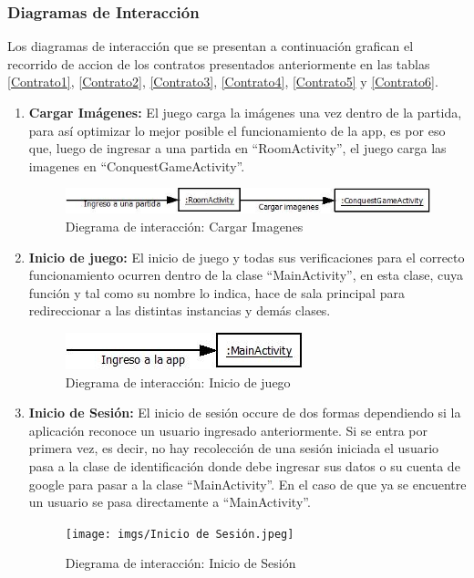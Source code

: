 \documentclass[12pt]{article}
\begin{document}
\subsubsection{Diagramas de Interacción}
Los diagramas de interacción que se presentan a continuación grafican el recorrido de accion de los contratos presentados anteriormente en las tablas \ref{Contrato1}, \ref{Contrato2}, \ref{Contrato3}, \ref{Contrato4}, \ref{Contrato5} y \ref{Contrato6}.
\bigskip
\begin{enumerate}[1.]
	\item \textbf{Cargar Imágenes:}
El juego carga la imágenes una vez dentro de la partida, para así optimizar lo mejor posible el funcionamiento de la app, es por eso que, luego de ingresar a una partida en “RoomActivity”, el juego carga las imagenes en “ConquestGameActivity”.
	\begin{figure}[H]
		\centering
		\includegraphics[scale=1]{imgs/Cargar Imagenes.jpeg}
		\caption{Diegrama de interacción: Cargar Imagenes}
	\end{figure}

	\item \textbf{Inicio de juego:}
El inicio de juego y todas sus verificaciones para el correcto funcionamiento ocurren dentro de la clase “MainActivity”, en esta clase, cuya función y tal como su nombre lo indica, hace de sala principal para redireccionar a las distintas instancias y demás clases.

	\begin{figure}[H]
		\centering
		\includegraphics[scale=1]{imgs/Inicio de juego.jpeg}
		\caption{Diegrama de interacción: Inicio de juego}
	\end{figure}

	\item \textbf{Inicio de Sesión:}
El inicio de sesión occure de dos formas dependiendo si la aplicación reconoce un usuario ingresado anteriormente. Si se entra por primera vez, es decir, no hay recolección de una sesión iniciada el usuario pasa a la clase de identificación donde debe ingresar sus datos o su cuenta de google para pasar a la clase “MainActivity”. En el caso de que ya se encuentre un usuario se pasa directamente a “MainActivity”.
	\begin{figure}[H]
		\centering
		\texttt{[image: imgs/Inicio de Sesión.jpeg]}
		\caption{Diegrama de interacción: Inicio de Sesión}
	\end{figure}


\end{enumerate}
\end{document}
